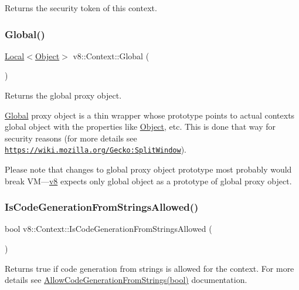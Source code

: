 Returns the security token of this context. \mbox{\label{classv8_1_1Context_af5cd9f97ef6a3307c1c21f80f4b743eb}} 
\subsubsection{\texorpdfstring{Global()}{Global()}}
{\footnotesize\ttfamily \mbox{\hyperlink{classv8_1_1Local}{Local}}$<$\mbox{\hyperlink{classv8_1_1Object}{Object}}$>$ v8\+::\+Context\+::\+Global (\begin{DoxyParamCaption}{ }\end{DoxyParamCaption})}

Returns the global proxy object.

\mbox{\hyperlink{classv8_1_1Global}{Global}} proxy object is a thin wrapper whose prototype points to actual context\textquotesingle{}s global object with the properties like \mbox{\hyperlink{classv8_1_1Object}{Object}}, etc. This is done that way for security reasons (for more details see \href{https://wiki.mozilla.org/Gecko:SplitWindow}{\tt https\+://wiki.\+mozilla.\+org/\+Gecko\+:\+Split\+Window}).

Please note that changes to global proxy object prototype most probably would break VM---\mbox{\hyperlink{namespacev8}{v8}} expects only global object as a prototype of global proxy object. \mbox{\label{classv8_1_1Context_aa7a960a232d232d1a2a904c2e6c18831}} 
\subsubsection{\texorpdfstring{Is\+Code\+Generation\+From\+Strings\+Allowed()}{IsCodeGenerationFromStringsAllowed()}}
{\footnotesize\ttfamily bool v8\+::\+Context\+::\+Is\+Code\+Generation\+From\+Strings\+Allowed (\begin{DoxyParamCaption}{ }\end{DoxyParamCaption})}

Returns true if code generation from strings is allowed for the context. For more details see \mbox{\hyperlink{classv8_1_1Context_a794ccc42113566f5d363f89c8b0d3c2c}{Allow\+Code\+Generation\+From\+Strings(bool)}} documentation. \mbox{\label{classv8_1_1Context_adca49dc82992b2867edefebed0c4ac6b}} 
